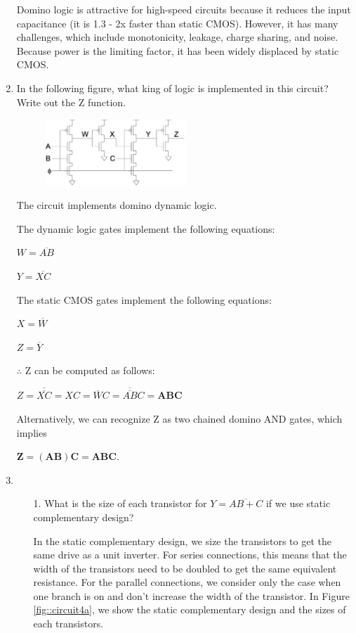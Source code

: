 \documentclass[fleqn]{article}
\begin{document}
\begin{enumerate}
		Domino logic is attractive for high-speed circuits because it reduces the input capacitance (it is 1.3 - 2x faster than static CMOS). However, it has many challenges, which include monotonicity, leakage, charge sharing, and noise. Because power is the limiting factor, it has been widely displaced by static CMOS.
		
		\item In the following figure, what king of logic is implemented in this circuit? Write out the Z function.
		
			\begin{figure}[H]
				\centerline{\includegraphics[width=0.5\textwidth]{circuit_question3.png}}
				\label{fig::circuit_question3}
			\end{figure}

			The circuit implements domino dynamic logic.
			
			The dynamic logic gates implement the following equations:
			
			$W = \overline{AB}$
			
			$Y = \overline{XC}$
			
			The static CMOS gates implement the following equations:
			
			$X = \overline{W}$
			
			$Z = \overline{Y}$
			
			$\therefore$ Z can be computed as follows:
			
			$Z = \overline{\overline{XC}} = XC = \overline{W}C = \overline{\overline{AB}}C = \mathbf{ABC}$
			
			Alternatively, we can recognize Z as two chained domino AND gates, which implies
			
			$\mathbf{Z = (AB)C = ABC}$.
			
		\item ~
		
			\begin{enumerate}
			
			\item[1.] What is the size of each transistor for $Y = \overline{AB + C}$ if we use static complementary design?
			
			In the static complementary design, we size the transistors to get the same drive as a unit inverter. For series connections, this means that the width of the transistors need to be doubled to get the same equivalent resistance. For the parallel connections, we consider only the case when one branch is on and don't increase the width of the transistor. In Figure \ref{fig::circuit4a}, we show the static complementary design and the sizes of each transistors.
			

\end{enumerate}
\end{enumerate}
\end{document}
